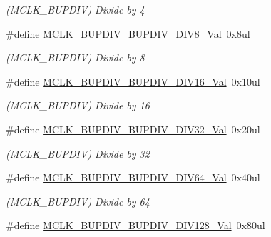 \begin{DoxyCompactItemize}
\begin{DoxyCompactList}\small\item\em (M\+C\+L\+K\+\_\+\+B\+U\+P\+D\+I\+V) Divide by 4 \end{DoxyCompactList}\item 
\hypertarget{group___s_a_m_l21___m_c_l_k_gaf66206caec0cf262aede3e55dec93ec7}{}\#define \hyperlink{group___s_a_m_l21___m_c_l_k_gaf66206caec0cf262aede3e55dec93ec7}{M\+C\+L\+K\+\_\+\+B\+U\+P\+D\+I\+V\+\_\+\+B\+U\+P\+D\+I\+V\+\_\+\+D\+I\+V8\+\_\+\+Val}~0x8ul\label{group___s_a_m_l21___m_c_l_k_gaf66206caec0cf262aede3e55dec93ec7}

\begin{DoxyCompactList}\small\item\em (M\+C\+L\+K\+\_\+\+B\+U\+P\+D\+I\+V) Divide by 8 \end{DoxyCompactList}\item 
\hypertarget{group___s_a_m_l21___m_c_l_k_ga279f3f80490b7b0270a14b9ffb710a28}{}\#define \hyperlink{group___s_a_m_l21___m_c_l_k_ga279f3f80490b7b0270a14b9ffb710a28}{M\+C\+L\+K\+\_\+\+B\+U\+P\+D\+I\+V\+\_\+\+B\+U\+P\+D\+I\+V\+\_\+\+D\+I\+V16\+\_\+\+Val}~0x10ul\label{group___s_a_m_l21___m_c_l_k_ga279f3f80490b7b0270a14b9ffb710a28}

\begin{DoxyCompactList}\small\item\em (M\+C\+L\+K\+\_\+\+B\+U\+P\+D\+I\+V) Divide by 16 \end{DoxyCompactList}\item 
\hypertarget{group___s_a_m_l21___m_c_l_k_gad1c5a99f229c470b78e648faed733586}{}\#define \hyperlink{group___s_a_m_l21___m_c_l_k_gad1c5a99f229c470b78e648faed733586}{M\+C\+L\+K\+\_\+\+B\+U\+P\+D\+I\+V\+\_\+\+B\+U\+P\+D\+I\+V\+\_\+\+D\+I\+V32\+\_\+\+Val}~0x20ul\label{group___s_a_m_l21___m_c_l_k_gad1c5a99f229c470b78e648faed733586}

\begin{DoxyCompactList}\small\item\em (M\+C\+L\+K\+\_\+\+B\+U\+P\+D\+I\+V) Divide by 32 \end{DoxyCompactList}\item 
\hypertarget{group___s_a_m_l21___m_c_l_k_gab7bf2544525ba0a186073d360323d96f}{}\#define \hyperlink{group___s_a_m_l21___m_c_l_k_gab7bf2544525ba0a186073d360323d96f}{M\+C\+L\+K\+\_\+\+B\+U\+P\+D\+I\+V\+\_\+\+B\+U\+P\+D\+I\+V\+\_\+\+D\+I\+V64\+\_\+\+Val}~0x40ul\label{group___s_a_m_l21___m_c_l_k_gab7bf2544525ba0a186073d360323d96f}

\begin{DoxyCompactList}\small\item\em (M\+C\+L\+K\+\_\+\+B\+U\+P\+D\+I\+V) Divide by 64 \end{DoxyCompactList}\item 
\hypertarget{group___s_a_m_l21___m_c_l_k_ga5535fc6657d52b803831d35ac47a03e5}{}\#define \hyperlink{group___s_a_m_l21___m_c_l_k_ga5535fc6657d52b803831d35ac47a03e5}{M\+C\+L\+K\+\_\+\+B\+U\+P\+D\+I\+V\+\_\+\+B\+U\+P\+D\+I\+V\+\_\+\+D\+I\+V128\+\_\+\+Val}~0x80ul\label{group___s_a_m_l21___m_c_l_k_ga5535fc6657d52b803831d35ac47a03e5}


\end{DoxyCompactItemize}
